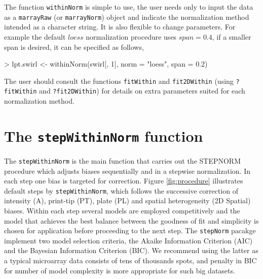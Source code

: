 \documentclass[11pt]{article}
\newcommand{\code}[1]{{\tt #1}}
\newcommand{\Rfunc}[1]{{\tt #1}}
\begin{document}
The function \Rfunc{withinNorm} is simple to use, the user needs only to input the
data as a \code{marrayRaw} (or \code{marrayNorm}) object and indicate the normalization 
method intended as a character string. It is also flexible to change parameters. For
example the default $loess$ normalization procedure uses $span = 0.4$, if a smaller span
is desired, it can be specified as follows, 

\begin{Schunk}
\begin{Sinput}
> lpt.swirl <- withinNorm(swirl[, 1], norm = "loess", span = 0.2)
\end{Sinput}
\end{Schunk}

The user should consult the functions \Rfunc{fitWithin} and \Rfunc{fit2DWithin} (using
\code{?fitWithin} and \code{?fit2DWithin}) for details on extra parameters suited for
each normalization method.
 

\section{The \Rfunc{stepWithinNorm} function}

The \Rfunc{stepWithinNorm} is the main function that carries out the 
STEPNORM procedure which adjusts biases sequentially and in a stepwise
normalization. In each step one bias is targeted for correction. Figure
\ref{fig:procedure} illustrates default steps by \Rfunc{stepWithinNorm},
which follows the successive correction of intensity (A), print-tip (PT), plate (PL) 
and spatial heterogeneity (2D Spatial) biases. Within each step several
models are employed competitively and the model that achieves the best
balance between the goodness of fit and simplicity is chosen for application
before proceeding to the next step. The \code{stepNorm} pacakge implement
two model selection criteria, the Akaike Information Criterion (AIC) and
the Bayesian Information Criterion (BIC). We recommend using the latter as
a typical microarray data consists of tens of thousands spots, and penalty
in BIC for number of model complexity is more appropriate for such big
datasets. \\
\end{document}
